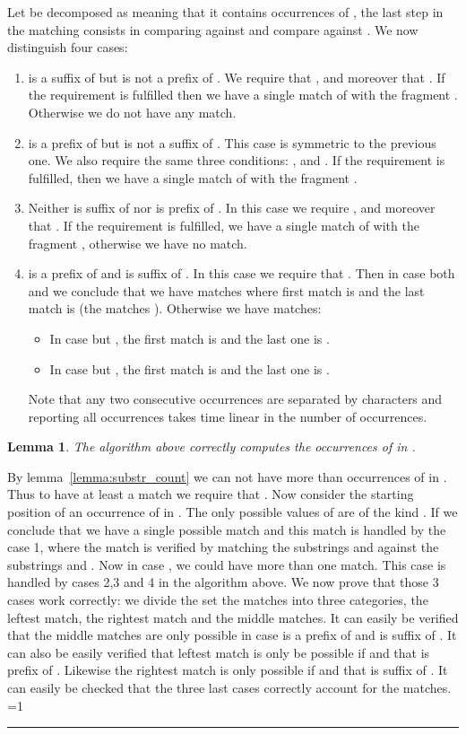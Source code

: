 \documentclass{article}
\newcommand{\?}{\mskip1.5mu}
\newcounter{noqed}
\newcommand{\qed}{ \ifmmode\mbox{
}\fi\rule[-.05em]{.3em}{.7em}\setcounter{noqed}{0}}
\newenvironment{proof}[1][{}]{\noindent{\bf Proof#1.
}\setcounter{noqed}{1}}{\ifnum\value{noqed}=1\qed\fi\par\medskip}
\newtheorem{lemma}{Lemma}
\begin{document}
Let  be decomposed as  meaning that it contains  occurrences of , the last step in the matching consists in comparing  against  and compare  against . We now distinguish four cases: 
\begin{enumerate}
\item  is a suffix of  but  is not a prefix of . We require that ,  and moreover that . If the requirement is fulfilled then we have a single match of  with the fragment . Otherwise we do not have any match. 
\item  is a prefix of  but  is not a suffix of . This case is symmetric to the previous one. We also require the same three conditions: , and . If the requirement is fulfilled, then we have a single match of  with the fragment .
\item Neither  is suffix of  nor  is prefix of . In this case we require ,  and moreover that . If the requirement is fulfilled, we have a single match of  with the fragment , otherwise we have no match.
\item  is a prefix of  and  is suffix of . In this case we require that . Then in case both  and  we conclude that we have  matches where first match is  and the last match is  (the matches ). Otherwise we have  matches:
\begin{itemize}
\item In case  but , the first match is  and the last one is .
\item In case  but , the first match is  and the last one is .
\end{itemize}
Note that any two consecutive occurrences are separated by  characters and reporting all occurrences takes time linear in the number of occurrences. 
\end{enumerate}
\begin{lemma}
The algorithm above correctly computes the occurrences of  in .
\end{lemma}
\begin{proof}
By lemma~\ref{lemma:substr_count} we can not have more than  occurrences of  in . Thus to have at least a match we require that . Now consider the starting position  of an occurrence of  in . The only possible values of  are of the kind . If  we conclude that we have a single possible match and this match is handled by the case 1, where the match is verified by matching the substrings  and  against the substrings  and . Now in case , we could have more than one match. This case is handled by cases 2,3 and 4 in the algorithm above. 
We now prove that those 3 cases work correctly: we divide the set the matches into three categories, the leftest match, the rightest match and the  middle matches. It can easily be verified that the middle matches are only possible in case  is a prefix of  and  is suffix of . It can also be easily verified that leftest match is only be possible if  and that  is prefix of . Likewise the rightest match is only possible if  and that  is suffix of . It can easily be checked that the three last cases correctly account for the matches. 
\end{proof}
\end{document}
